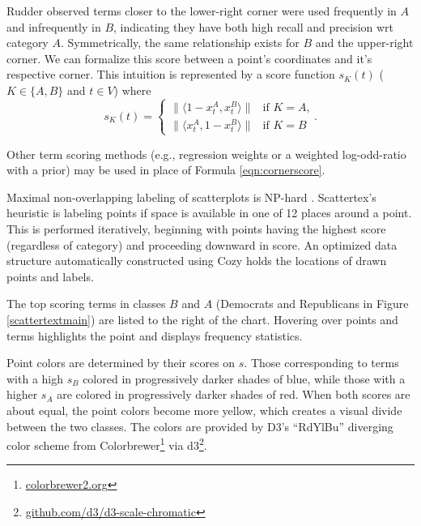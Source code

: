 \documentclass[11pt,a4paper]{article}
\begin{document}
Rudder  observed terms closer to the lower-right corner were used frequently in $A$ and infrequently in $B$, indicating they have both high recall and precision wrt category $A$.  Symmetrically, the same relationship exists for $B$ and the upper-right corner.  We can formalize this score between a point's coordinates and it's respective corner.  This intuition is represented by a score function $s_K(t)$ ($K\in\{A,B\}$ and $t\in V$) where
\vspace{-.3cm}
\begin{equation}
s_K(t)= 
\begin{cases} \|\langle 1-x_{t}^{A}, x_{t}^{B}\rangle\| & \text{if $K=A$,}
\\
\|\langle x_{t}^{A}, 1-x_{t}^{B}\rangle\| &\text{if $K=B$}
\end{cases}.
  \label{eqn:cornerscore}
\end{equation}

Other term scoring methods (e.g., regression weights or a weighted log-odd-ratio with a prior) may be used in place of Formula \ref{eqn:cornerscore}.

Maximal non-overlapping labeling of scatterplots is NP-hard \cite{Been2007}. Scattertex's heuristic is labeling points if space is available in one of 12 places around a point.  This is performed iteratively, beginning with points having the highest score (regardless of category) and proceeding downward in score.  An optimized data structure automatically constructed using Cozy \cite{cozy} holds the locations of drawn points and labels. 

The top scoring terms in classes $B$ and $A$ (Democrats and Republicans in Figure \ref{scattertextmain}) are listed to the right of the chart.  Hovering over points and terms highlights the point and displays frequency statistics.

Point colors are determined by their scores on $s$.  Those corresponding to terms with a high $s_B$ colored in progressively darker shades of blue, while those with a higher $s_A$ are colored in progressively darker shades of red.  When both scores are about equal, the point colors become more yellow, which creates a visual divide between the two classes.   The colors are provided by D3's ``RdYlBu'' diverging color scheme from Colorbrewer\footnote{\href{http://colorbrewer2.org/}{colorbrewer2.org}} via d3\footnote{\href{https://github.com/d3/d3-scale-chromatic}{github.com/d3/d3-scale-chromatic}}.
\end{document}
